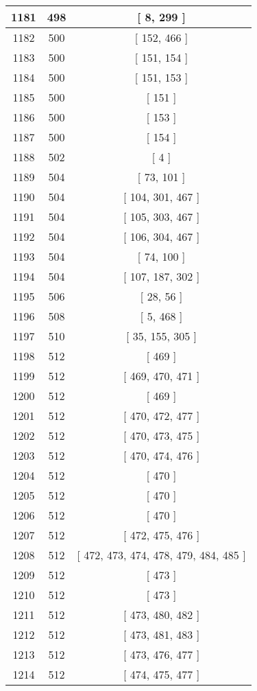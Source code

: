 \begin{center}
\begin{longtable}[H]{|| c c c ||}
\hline
1181 & 498 & [ 8, 299 ] \\ 
\hline
1182 & 500 & [ 152, 466 ] \\ 
\hline
1183 & 500 & [ 151, 154 ] \\ 
\hline
1184 & 500 & [ 151, 153 ] \\ 
\hline
1185 & 500 & [ 151 ] \\ 
\hline
1186 & 500 & [ 153 ] \\ 
\hline
1187 & 500 & [ 154 ] \\ 
\hline
1188 & 502 & [ 4 ] \\ 
\hline
1189 & 504 & [ 73, 101 ] \\ 
\hline
1190 & 504 & [ 104, 301, 467 ] \\ 
\hline
1191 & 504 & [ 105, 303, 467 ] \\ 
\hline
1192 & 504 & [ 106, 304, 467 ] \\ 
\hline
1193 & 504 & [ 74, 100 ] \\ 
\hline
1194 & 504 & [ 107, 187, 302 ] \\ 
\hline
1195 & 506 & [ 28, 56 ] \\ 
\hline
1196 & 508 & [ 5, 468 ] \\ 
\hline
1197 & 510 & [ 35, 155, 305 ] \\ 
\hline
1198 & 512 & [ 469 ] \\ 
\hline
1199 & 512 & [ 469, 470, 471 ] \\ 
\hline
1200 & 512 & [ 469 ] \\ 
\hline
1201 & 512 & [ 470, 472, 477 ] \\ 
\hline
1202 & 512 & [ 470, 473, 475 ] \\ 
\hline
1203 & 512 & [ 470, 474, 476 ] \\ 
\hline
1204 & 512 & [ 470 ] \\ 
\hline
1205 & 512 & [ 470 ] \\ 
\hline
1206 & 512 & [ 470 ] \\ 
\hline
1207 & 512 & [ 472, 475, 476 ] \\ 
\hline
1208 & 512 & [ 472, 473, 474, 478, 479, 484, 485 ] \\ 
\hline
1209 & 512 & [ 473 ] \\ 
\hline
1210 & 512 & [ 473 ] \\ 
\hline
1211 & 512 & [ 473, 480, 482 ] \\ 
\hline
1212 & 512 & [ 473, 481, 483 ] \\ 
\hline
1213 & 512 & [ 473, 476, 477 ] \\ 
\hline
1214 & 512 & [ 474, 475, 477 ] \\ 

\end{longtable}
\end{center}

